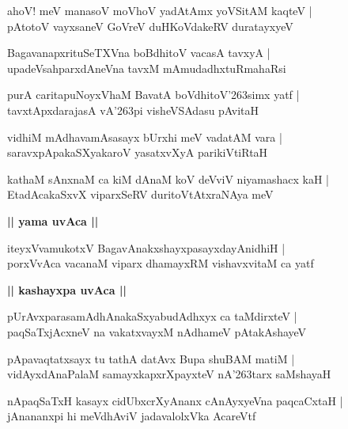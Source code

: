 \documentclass[twoside,12pt,openright]{book}
\def\S{\char'263}
\newcounter{shloka}[chapter]
\def\uvaca#1{\centerline{{\large\textbf{#1}}}}
\begin{document}
\begin{shloka}%
ahoV! meV manasoV moVhoV yadAtAmx yoVSitAM kaqteV |\\
pAtotoV vayxsaneV GoVreV duHKoVdakeRV duratayxyeV 
\end{shloka}

\begin{shloka}%
BagavanapxrituSeTXVna boBdhitoV vacasA tavxyA |\\
upadeVsahparxdAneVna tavxM mAmudadhxtuRmahaRsi
\end{shloka}

\begin{shloka}%
purA caritapuNoyxVhaM BavatA boVdhitoV\S simx yatf |\\
tavxtApxdarajasA vA\S pi visheVSAdasu pAvitaH 
\end{shloka}

\begin{shloka}%
vidhiM mAdhavamAsasayx bUrxhi meV vadatAM vara |\\
saravxpApakaSXyakaroV yasatxvXyA parikiVtiRtaH 
\end{shloka}

\begin{shloka}%
kathaM sAnxnaM ca kiM dAnaM koV deVviV niyamashacx kaH |\\
EtadAcakaSxvX viparxSeRV duritoVtAtxraNAya meV 
\end{shloka}

\uvaca{|| yama uvAca ||}

\begin{shloka}%
iteyxVvamukotxV BagavAnakxshayxpasayxdayAnidhiH |\\
porxVvAca vacanaM viparx dhamayxRM vishavxvitaM ca yatf 
\end{shloka}

\uvaca{|| kashayxpa uvAca ||}

\begin{shloka}%
pUrAvxparasamAdhAnakaSxyabudAdhxyx ca taMdirxteV |\\
paqSaTxjAcxneV na vakatxvayxM nAdhameV pAtakAshayeV 
\end{shloka}

\begin{shloka}%
pApavaqtatxsayx tu tathA datAvx Bupa shuBAM matiM |\\
vidAyxdAnaPalaM samayxkapxrXpayxteV nA\S tarx saMshayaH 
\end{shloka}

\begin{shloka}%
nApaqSaTxH kasayx cidUbxcrXyAnanx cAnAyxyeVna paqcaCxtaH |\\
jAnananxpi hi meVdhAviV jadavalolxVka AcareVtf
\end{shloka}
\end{document}
